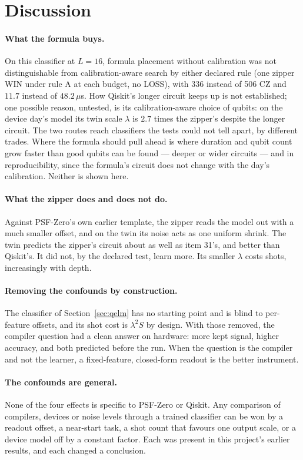 \documentclass[11pt]{article}
\begin{document}
\section{Discussion}

\paragraph{What the formula buys.} On this classifier at $L = 16$, formula placement without calibration
was not distinguishable from calibration-aware search by either declared rule (one zipper WIN under rule A at each
budget, no LOSS), with 336 instead of 506 CZ and $11.7$ instead of $48.2\,\mu$s. How Qiskit's longer circuit keeps
up is not established; one possible reason, untested, is its calibration-aware choice of qubits: on the device day's
model its twin scale $\lambda$ is $2.7$ times the zipper's despite the longer circuit. The two routes reach
classifiers the tests could not tell apart, by different trades. Where the formula should pull ahead is where
duration and qubit count grow faster than good qubits can be found --- deeper or wider circuits --- and in
reproducibility, since the formula's circuit does not change with the day's calibration. Neither is shown here.

\paragraph{What the zipper does and does not do.} Against PSF-Zero's own earlier template, the zipper reads the model
out with a much smaller offset, and on the twin its noise acts as one uniform shrink. The twin predicts the zipper's
circuit about as well as item 31's, and better than Qiskit's. It
did not, by the declared test, learn more. Its smaller $\lambda$ costs shots, increasingly with depth.

\paragraph{Removing the confounds by construction.} The classifier of Section~\ref{sec:qelm} has no starting point
and is blind to per-feature offsets, and its shot cost is $\lambda^2S$ by design. With those removed, the compiler
question had a clean answer on hardware: more kept signal, higher accuracy, and both predicted before the run. When
the question is the compiler and not the learner, a fixed-feature, closed-form readout is the better instrument.

\paragraph{The confounds are general.} None of the four effects is specific to PSF-Zero or Qiskit. Any comparison of
compilers, devices or noise levels through a trained classifier can be won by a readout offset, a near-start task, a
shot count that favours one output scale, or a device model off by a constant factor. Each was present in this
project's earlier results, and each changed a conclusion.
\end{document}
